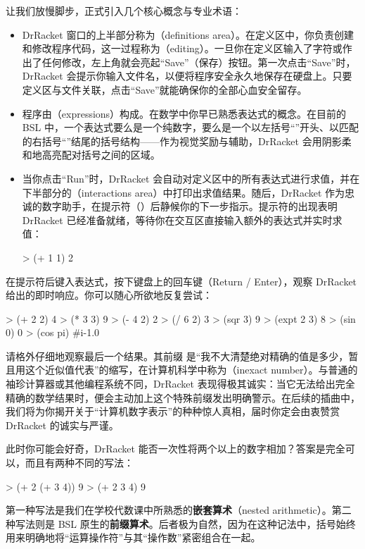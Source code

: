 让我们放慢脚步，正式引入几个核心概念与专业术语：
\begin{itemize}
  \item DrRacket 窗口的上半部分称为（definitions area）。在定义区中，你负责创建和修改程序代码，这一过程称为（editing）。一旦你在定义区输入了字符或作出了任何修改，左上角就会亮起“Save”（保存）按钮。第一次点击“Save”时，DrRacket 会提示你输入文件名，以便将程序安全永久地保存在硬盘上。只要定义区与文件关联，点击“Save”就能确保你的全部心血安全留存。
  
  \item 程序由（expressions）构成。在数学中你早已熟悉表达式的概念。在目前的 BSL 中，一个表达式要么是一个纯数字，要么是一个以左括号“\code{(}”开头、以匹配的右括号“\code{)}”结尾的括号结构——作为视觉奖励与辅助，DrRacket 会用阴影柔和地高亮配对括号之间的区域。
  
  \item 当你点击“Run”时，DrRacket 会自动对定义区中的所有表达式进行求值，并在下半部分的（interactions area）中打印出求值结果。随后，DrRacket 作为忠诚的数字助手，在提示符（\code{>}）后静候你的下一步指示。提示符的出现表明 DrRacket 已经准备就绪，等待你在交互区直接输入额外的表达式并实时求值：
  \begin{replbox}
> (+ 1 1)
2
  \end{replbox}
\end{itemize}

在提示符后键入表达式，按下键盘上的回车键（Return / Enter），观察 DrRacket 给出的即时响应。你可以随心所欲地反复尝试：
\begin{replbox}
> (+ 2 2)
4
> (* 3 3)
9
> (- 4 2)
2
> (/ 6 2)
3
> (sqr 3)
9
> (expt 2 3)
8
> (sin 0)
0
> (cos pi)
#i-1.0
\end{replbox}

请格外仔细地观察最后一个结果。其前缀  是“我不大清楚绝对精确的值是多少，暂且用这个近似值代表”的缩写，在计算机科学中称为（inexact number）。与普通的袖珍计算器或其他编程系统不同，DrRacket 表现得极其诚实：当它无法给出完全精确的数学结果时，便会主动加上这个特殊前缀发出明确警示。在后续的插曲中，我们将为你揭开关于“计算机数字表示”的种种惊人真相，届时你定会由衷赞赏 DrRacket 的诚实与严谨。

此时你可能会好奇，DrRacket 能否一次性将两个以上的数字相加？答案是完全可以，而且有两种不同的写法：
\begin{replbox}
> (+ 2 (+ 3 4))
9
> (+ 2 3 4)
9
\end{replbox}
第一种写法是我们在学校代数课中所熟悉的\textbf{嵌套算术}（nested arithmetic）。第二种写法则是 BSL 原生的\textbf{前缀算术}。后者极为自然，因为在这种记法中，括号始终用来明确地将“运算操作符”与其“操作数”紧密组合在一起。

